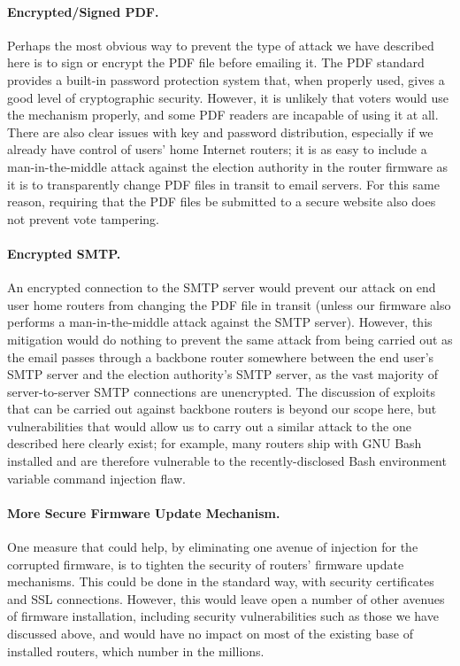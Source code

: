 \documentclass{article}
\begin{document}
\paragraph{Encrypted/Signed PDF.}

Perhaps the most obvious way to prevent the type of attack we have
described here is to sign or encrypt the PDF file before emailing
it. The PDF standard provides a built-in password protection system
that, when properly used, gives a good level of cryptographic
security. However, it is unlikely that voters would use the mechanism
properly, and some PDF readers are incapable of using it at all. There
are also clear issues with key and password distribution, especially
if we already have control of users' home Internet routers; it is as
easy to include a man-in-the-middle attack against the election
authority in the router firmware as it is to transparently change PDF
files in transit to email servers. For this same reason, requiring
that the PDF files be submitted to a secure website also does not
prevent vote tampering.

\paragraph{Encrypted SMTP.}

An encrypted connection to the SMTP server would prevent our attack on
end user home routers from changing the PDF file in transit (unless
our firmware also performs a man-in-the-middle attack against the SMTP
server). However, this mitigation would do nothing to prevent the same
attack from being carried out as the email passes through a backbone
router somewhere between the end user's SMTP server and the election
authority's SMTP server, as the vast majority of server-to-server SMTP
connections are unencrypted. The discussion of exploits that can be
carried out against backbone routers is beyond our scope here, but
vulnerabilities that would allow us to carry out a similar attack to
the one described here clearly exist; for example, many routers ship
with GNU Bash installed and are therefore vulnerable to the
recently-disclosed Bash environment variable command injection flaw.

\paragraph{More Secure Firmware Update Mechanism.}

One measure that could help, by eliminating one avenue of injection
for the corrupted firmware, is to tighten the security of routers'
firmware update mechanisms. This could be done in the standard way,
with security certificates and SSL connections. However, this would
leave open a number of other avenues of firmware installation,
including security vulnerabilities such as those we have discussed
above, and would have no impact on most of the existing base of
installed routers, which number in the millions.
\end{document}
